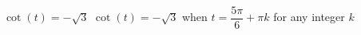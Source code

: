 {$\cot(t) = -\sqrt{3}$}
{$\cot(t) = -\sqrt{3}$ when $t = \dfrac{5\pi}{6} + \pi k$ for any integer $k$}
